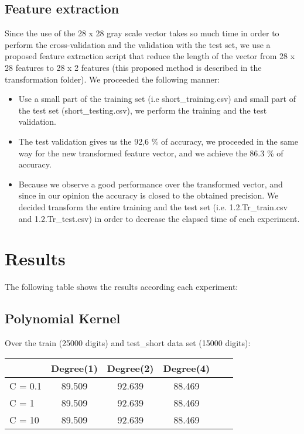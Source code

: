\documentclass[11pt,a4paper]{article}
\begin{document}
\subsection{Feature extraction}

Since the use of the 28 x 28 gray scale vector takes so much time in order to perform the cross-validation and the validation with the test set, we use a proposed feature extraction script that reduce the length of the vector from 28 x 28 features to 28 x 2 features (this proposed method is described in the transformation folder). We proceeded the following manner:

\begin{itemize}
	\item Use a small part of the training set (i.e short\_training.csv) and small part of the test set (short\_testing.csv), we perform the training and the test validation.
	\item The test validation gives us the 92,6 \% of accuracy, we proceeded in the same way for the new transformed feature vector, and we achieve the 86.3 \% of accuracy.
	\item Because we observe a good performance over the transformed vector, and since in our opinion the accuracy is closed to the obtained precision. We decided transform the entire training and the test set (i.e. 1.2.Tr\_train.csv and  1.2.Tr\_test.csv) in order to decrease the elapsed time of each experiment.        
\end{itemize}     


\section{Results}

The following table shows the results according each experiment:

\subsection{Polynomial Kernel}

Over the train (25000 digits) and test\_short data set (15000 digits):\\

\begin{tabular}{l*{4}{c}r}
	& Degree(1) & Degree(2) & Degree(4) \\
\hline
C = 0.1	&	89.509	& 	92.639	&	88.469 \\ 
C = 1	&	89.509	&	92.639	&	88.469 \\
C = 10  &	89.509	&	92.639	&	88.469 \\
\end{tabular} \\
\end{document}
